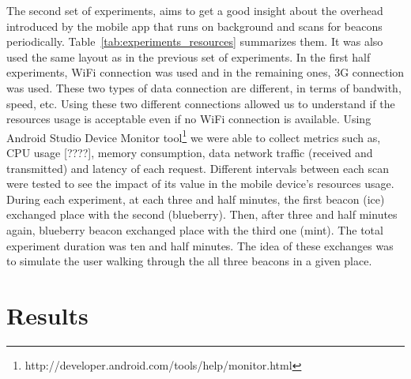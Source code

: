 The second set of experiments, aims to get a good insight about the overhead introduced by the mobile app that runs on background and scans for beacons periodically. Table~\ref{tab:experiments_resources} summarizes them. It was also used the same layout as in the previous set of experiments. In the first half experiments, \gls{WiFi} connection was used and in the remaining ones, \gls{3G} connection was used. These two types of data connection are different, in terms of bandwith, speed, etc. Using these two different connections allowed us to understand if the resources usage is acceptable even if no \gls{WiFi} connection is available. Using Android Studio Device Monitor tool\footnote{http://developer.android.com/tools/help/monitor.html} we were able to collect metrics such as, \gls{CPU} usage [????], memory consumption, data network traffic (received and transmitted) and latency of each request.
Different intervals between each scan were tested to see the impact of its value in the mobile device's resources usage.
During each experiment, at each three and half minutes, the first beacon (ice) exchanged place with the second (blueberry). Then, after three and half minutes again, blueberry beacon exchanged place with the third one (mint). The total experiment duration was ten and half minutes. The idea of these exchanges was to simulate the user walking through the all three beacons in a given place.



\section{Results}
\label{sec:results}
